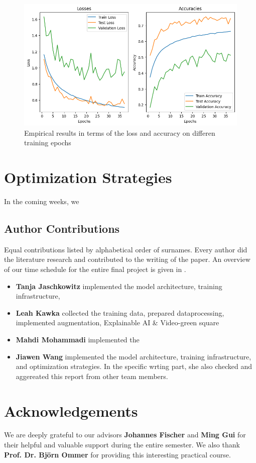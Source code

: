 \begin{figure}[t]
  \centering
   \includegraphics[width=0.95\linewidth]{output.png}
   \caption{Empirical results in terms of the loss and accuracy on differen training epochs}
   \label{fig:result}
\end{figure}

\section{Optimization Strategies}
In the coming weeks, 
we 

\subsection*{Author Contributions}
\label{sec:author}
Equal contributions listed by alphabetical order of surnames. 
Every author did the literature research and contributed to the writing of the paper. 
An overview of our time schedule for the entire final project is given in . 

\begin{itemize}
  \item \textbf{Tanja Jaschkowitz} implemented the model architecture, training infrastructure, 
  \item \textbf{Leah Kawka} collected the training data, prepared dataprocessing, implemented augmentation, Explainable AI \& Video-green square
  \item \textbf{Mahdi Mohammadi} implemented the 
  \item \textbf{Jiawen Wang} implemented the model architecture, training infrastructure, and optimization strategies. 
  In the specific wrting part, she also checked and aggereated this report from other team members.
\end{itemize}

\section*{Acknowledgements}

We are deeply grateful to our advisors \textbf{Johannes Fischer} and \textbf{Ming Gui} for their helpful and valuable support during the entire semester. 
We also thank \textbf{Prof. Dr. Björn Ommer} for providing this interesting practical course.